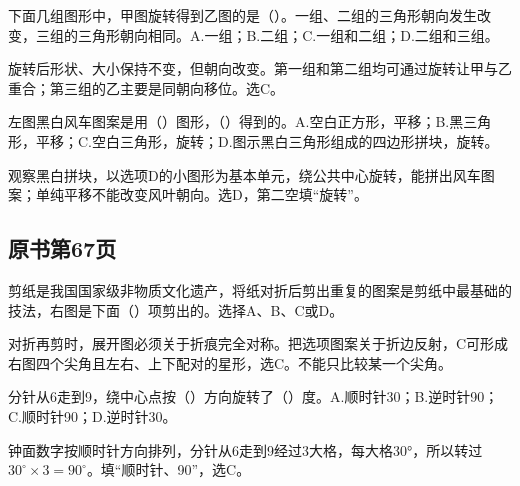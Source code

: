 下面几组图形中，甲图旋转得到乙图的是（\hspace{1.8em}）。一组、二组的三角形朝向发生改变，三组的三角形朝向相同。A.一组；B.二组；C.一组和二组；D.二组和三组。\par
{}
\begin{BookAnswer}
旋转后形状、大小保持不变，但朝向改变。第一组和第二组均可通过旋转让甲与乙重合；第三组的乙主要是同朝向移位。选C。
\end{BookAnswer}

左图黑白风车图案是用（\hspace{1.8em}）图形，（\hspace{1.8em}）得到的。A.空白正方形，平移；B.黑三角形，平移；C.空白三角形，旋转；D.图示黑白三角形组成的四边形拼块，旋转。\par
{}
\begin{BookAnswer}
观察黑白拼块，以选项D的小图形为基本单元，绕公共中心旋转，能拼出风车图案；单纯平移不能改变风叶朝向。选D，第二空填“旋转”。
\end{BookAnswer}



\subsection*{原书第67页}

剪纸是我国国家级非物质文化遗产，将纸对折后剪出重复的图案是剪纸中最基础的技法，右图是下面（\hspace{1.8em}）项剪出的。选择A、B、C或D。\par
{}
\begin{BookAnswer}
对折再剪时，展开图必须关于折痕完全对称。把选项图案关于折边反射，C可形成右图四个尖角且左右、上下配对的星形，选C。不能只比较某一个尖角。
\end{BookAnswer}

分针从6走到9，绕中心点按（\hspace{1.8em}）方向旋转了（\hspace{1.8em}）度。A.顺时针30；B.逆时针90；C.顺时针90；D.逆时针30。\par
\begin{BookAnswer}
钟面数字按顺时针方向排列，分针从6走到9经过3大格，每大格30°，所以转过\(30^\circ\times3=90^\circ\)。填“顺时针、90”，选C。
\end{BookAnswer}

